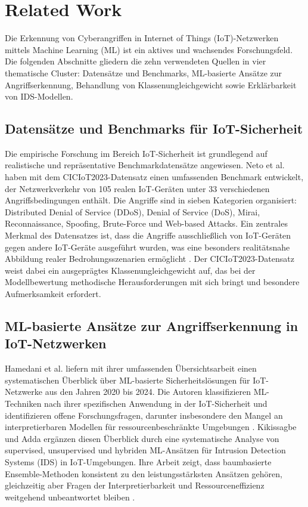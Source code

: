\section{Related Work}\label{related_work}

Die Erkennung von Cyberangriffen in Internet of Things (IoT)-Netzwerken mittels Machine Learning (ML) ist ein aktives und wachsendes Forschungsfeld. Die folgenden Abschnitte gliedern die zehn verwendeten Quellen in vier thematische Cluster: Datensätze und Benchmarks, ML-basierte Ansätze zur Angriffserkennung, Behandlung von Klassenungleichgewicht sowie Erklärbarkeit von IDS-Modellen.

\subsection{Datensätze und Benchmarks für IoT-Sicherheit}
Die empirische Forschung im Bereich IoT-Sicherheit ist grundlegend auf realistische und repräsentative Benchmarkdatensätze angewiesen. Neto et al. \cite{neto2023ciciot2023} haben mit dem CICIoT2023-Datensatz einen umfassenden Benchmark entwickelt, der Netzwerkverkehr von 105 realen IoT-Geräten unter 33 verschiedenen Angriffsbedingungen enthält. Die Angriffe sind in sieben Kategorien organisiert: Distributed Denial of Service (DDoS), Denial of Service (DoS), Mirai, Reconnaissance, Spoofing, Brute-Force und Web-based Attacks. Ein zentrales Merkmal des Datensatzes ist, dass die Angriffe ausschließlich von IoT-Geräten gegen andere IoT-Geräte ausgeführt wurden, was eine besonders realitätsnahe Abbildung realer Bedrohungsszenarien ermöglicht \cite{neto2023ciciot2023}. Der CICIoT2023-Datensatz weist dabei ein ausgeprägtes Klassenungleichgewicht auf, das bei der Modellbewertung methodische Herausforderungen mit sich bringt und besondere Aufmerksamkeit erfordert.

\subsection{ML-basierte Ansätze zur Angriffserkennung in IoT-Netzwerken}
Hamedani et al. \cite{hamedani2025iotsurvey} liefern mit ihrer umfassenden Übersichtsarbeit einen systematischen Überblick über ML-basierte Sicherheitslösungen für IoT-Netzwerke aus den Jahren 2020 bis 2024. Die Autoren klassifizieren ML-Techniken nach ihrer spezifischen Anwendung in der IoT-Sicherheit und identifizieren offene Forschungsfragen, darunter insbesondere den Mangel an interpretierbaren Modellen für ressourcenbeschränkte Umgebungen \cite{hamedani2025iotsurvey}. Kikissagbe und Adda \cite{kikissagbe2024review} ergänzen diesen Überblick durch eine systematische Analyse von supervised, unsupervised und hybriden ML-Ansätzen für Intrusion Detection Systems (IDS) in IoT-Umgebungen. Ihre Arbeit zeigt, dass baumbasierte Ensemble-Methoden konsistent zu den leistungsstärksten Ansätzen gehören, gleichzeitig aber Fragen der Interpretierbarkeit und Ressourceneffizienz weitgehend unbeantwortet bleiben \cite{kikissagbe2024review}.

